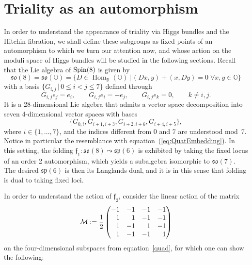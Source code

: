 \documentclass[10pt,a4paper]{amsart}
\numberwithin{equation}{section}
\newcommand{\Hom}{\operatorname{Hom}}
\newcommand{\Oct}{{\mathbb O}}
\begin{document}
\section{Triality as an automorphism}\label{sec:action}
In order to understand the appearance of triality via Higgs bundles and the Hitchin fibration, we shall define these subgroups as fixed points of an automorphism to which we turn our attention now, and whose action on the moduli space of Higgs bundles will be studied in the following sections. Recall that the Lie algebra of ${\rm Spin}(8)$ is given by
\begin{equation*}
\mathfrak{so}(8) = \mathfrak{so}(\Oct) = \{ D \in \Hom_\mathbb{R}(\Oct) \, | \, (Dx,y) + (x,Dy) = 0 \; \forall x,y \in \Oct \}
\end{equation*}
with a basis $\{ G_{i,j} \, | \, 0 \leq i < j \leq 7 \}$ defined through
\begin{equation*}
G_{i,j} e_j = e_i, \qquad G_{i,j} e_i = -e_j, \qquad G_{i,j} e_k = 0, \qquad k \neq i,j.
\end{equation*}
It is a 28-dimensional Lie algebra that admits a vector space decomposition into seven 4-dimensional vector spaces with bases
\begin{equation}
\{G_{0,i} , G_{i+1,i+3}, G_{i+2,i+6} , G_{i+4,i+5} \},\label{quad}
\end{equation}
where $i \in \{1, \dots , 7 \}$, and the indices different from $0$ and $7$ are understood mod~7. Notice in particular the resemblance with equation~(\ref{eq:QuatEmbedding}). In this setting, the folding $\mathfrak{f}_1\colon \mathfrak{so}(8) \leadsto \mathfrak{sp}(6)$ is exhibited by taking the fixed locus of an order 2 automorphism, which yields a subalgebra isomorphic to $\mathfrak{so}(7)$. The desired $\mathfrak{sp}(6)$ is then its Langlands dual, and it is in this sense that folding is dual to taking fixed loci.

In order to understand the action of $\mathfrak{f}_2$, consider the linear action of the matrix
\begin{equation}\label{eq:TrafoMatrix}
 \mathcal{M} := \frac{1}{2} \begin{pmatrix}
-1 & -1 & -1 & -1 \\
\hphantom{-}1 & \hphantom{-}1 & -1 & -1 \\
\hphantom{-}1 & -1 & \hphantom{-}1 & -1 \\
\hphantom{-}1 & -1 & -1 & \hphantom{-}1
\end{pmatrix}
\end{equation}
on the four-dimensional subspaces from equation~\eqref{quad}, for which one can show the following:
\end{document}
